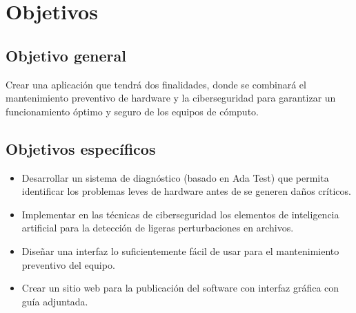 \section{Objetivos}
\subsection{Objetivo general}

Crear una aplicación que tendrá dos finalidades, donde se combinará el
mantenimiento preventivo de hardware y la ciberseguridad para garantizar un
funcionamiento óptimo y seguro de los equipos de cómputo.

\subsection{Objetivos específicos}

\begin{itemize}
  \item
    Desarrollar un sistema de diagnóstico (basado en Ada Test) que permita
    identificar los problemas leves de hardware antes de se generen daños
    críticos.

  \item
    Implementar en las técnicas de ciberseguridad los elementos de inteligencia
    artificial para la detección de ligeras perturbaciones en archivos.

  \item
    Diseñar una interfaz lo suficientemente fácil de usar para el mantenimiento
    preventivo del equipo.

  \item
    Crear un sitio web para la publicación del software con interfaz gráfica
    con guía adjuntada.
\end{itemize}
